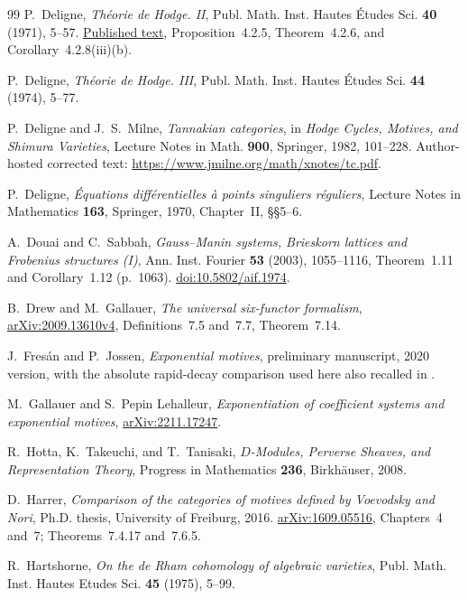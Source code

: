 \documentclass[11pt]{article}
\numberwithin{equation}{section}
\theoremstyle{definition}
\theoremstyle{remark}
\begin{document}
\begin{thebibliography}{99}
P.~Deligne,
\emph{Th\'eorie de Hodge. II},
Publ. Math. Inst. Hautes \'Etudes Sci. \textbf{40} (1971), 5--57.
\href{https://www.numdam.org/item/PMIHES_1971__40__5_0/}{Published text},
Proposition~4.2.5, Theorem~4.2.6, and Corollary~4.2.8(iii)(b).

P.~Deligne,
\emph{Th\'eorie de Hodge. III},
Publ. Math. Inst. Hautes \'Etudes Sci. \textbf{44} (1974), 5--77.

P.~Deligne and J.~S.~Milne, \emph{Tannakian categories}, in
\emph{Hodge Cycles, Motives, and Shimura Varieties}, Lecture Notes in Math.
\textbf{900}, Springer, 1982, 101--228. Author-hosted corrected text:
\url{https://www.jmilne.org/math/xnotes/tc.pdf}.

P.~Deligne, \emph{\'Equations diff\'erentielles \`a points singuliers
r\'eguliers}, Lecture Notes in Mathematics \textbf{163}, Springer, 1970,
Chapter~II, \S\S5--6.

A.~Douai and C.~Sabbah, \emph{Gauss--Manin systems, Brieskorn lattices
and Frobenius structures (I)}, Ann. Inst. Fourier \textbf{53} (2003),
1055--1116, Theorem~1.11 and Corollary~1.12 (p.~1063).
\href{https://doi.org/10.5802/aif.1974}{doi:10.5802/aif.1974}.

B.~Drew and M.~Gallauer,
\emph{The universal six-functor formalism},
\href{https://arxiv.org/abs/2009.13610v4}{arXiv:2009.13610v4},
Definitions~7.5 and~7.7, Theorem~7.14.

J.~Fres\'an and P.~Jossen, \emph{Exponential motives},
preliminary manuscript, 2020 version, with the absolute rapid-decay
comparison used here also recalled in \cite[\S3]{Snodgrass}.

M.~Gallauer and S.~Pepin Lehalleur, \emph{Exponentiation of coefficient
systems and exponential motives}, \href{https://arxiv.org/abs/2211.17247}{arXiv:2211.17247}.

R.~Hotta, K.~Takeuchi, and T.~Tanisaki,
\emph{$D$-Modules, Perverse Sheaves, and Representation Theory},
Progress in Mathematics \textbf{236}, Birkh\"auser, 2008.

D.~Harrer,
\emph{Comparison of the categories of motives defined by Voevodsky and Nori},
Ph.D. thesis, University of Freiburg, 2016.
\href{https://arxiv.org/abs/1609.05516}{arXiv:1609.05516},
Chapters~4 and~7; Theorems~7.4.17 and~7.6.5.

R.~Hartshorne,
\emph{On the de Rham cohomology of algebraic varieties},
Publ. Math. Inst. Hautes Etudes Sci. \textbf{45} (1975), 5--99.


\end{thebibliography}
\end{document}
